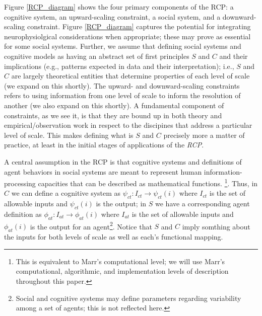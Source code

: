 \documentclass{article}
\begin{document}
Figure \ref{RCP_diagram} shows the four primary components of the RCP: a cognitive system, an upward-scaling constraint, a social system, and a downward-scaling constraint.  Figure \ref{RCP_diagram} captures the potential for integrating neurophysiolgical considerations when appropriate; these may prove as essential for some social systems. Further, we assume that defining social systems and cognitive models as having an abstract set of first principles $S$ and $C$ and their implications (e.g., patterns expected in data and their interpretation); i.e., $S$ and $C$ are largely theoretical entities that determine properties of each level of scale (we expand on this shortly).  The upward- and downward-scaling constraints refers to using information from one level of scale to inform the resolution of another (we also expand on this shortly).  A fundamental component of constraints, as we see it, is that they are bound up in both theory and empirical/observation work in respect to the discipines that address a particular level of scale.  This makes defining what is $S$ and $C$ precisely more a matter of practice, at least in the initial stages of applications of the \textit{RCP}.

A central assumption in the RCP is that cognitive systems and definitions of agent behaviors in social systems are meant to represent human information-processing capacities that can be described as mathematical functions. \cite{van Rooij, 2008}\footnote{This is equivalent to Marr's computational level; we will use Marr's computational, algorithmic, and implementation levels of description\cite{Marr,1981} throughout this paper.}. Thus, in $C$ we can define a cognitive system as $\psi_{ct}: I_{ct} \rightarrow \psi_{ct}(i)$ where $I_{ct}$ is the set of allowable inputs and $\psi_{ct}(i)$ is the output; in $S$ we have a corresponding agent definition as $\phi_{at}: I_{at} \rightarrow \phi_{at}(i)$ where $I_{at}$ is the set of allowable inputs and $\phi_{at}(i)$ is the output for an agent\footnote{Social and cognitive systems may define parameters regarding variability among a set of agents; this is not reflected here.}.  Notice that $S$ and $C$ imply somthing about the inputs for both levels of scale as well as each's functional mapping.
\end{document}
